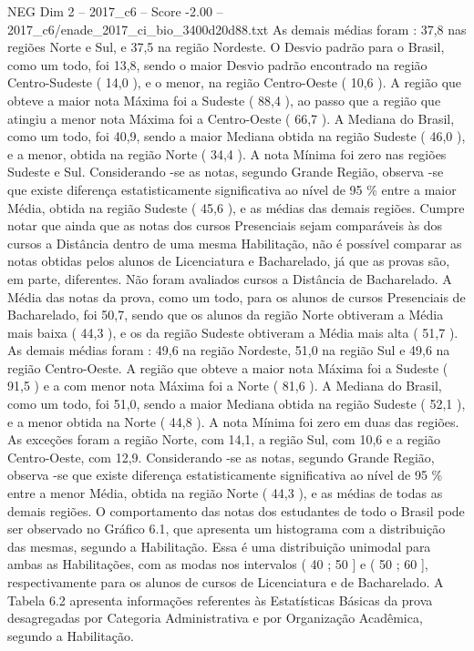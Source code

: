 \begin{textsample}{NEG Dim 2 – 2017\_c6 – Score -2.00 – 2017\_c6/enade\_2017\_ci\_bio\_3400d20d88.txt}
As demais médias foram : 37,8 nas regiões Norte e Sul, e 37,5 na região Nordeste.
O Desvio padrão para o Brasil, como um todo, foi 13,8, sendo o maior Desvio padrão encontrado na região Centro-Sudeste ( 14,0 ), e o menor, na região Centro-Oeste ( 10,6 ).
A região que obteve a maior nota Máxima foi a Sudeste ( 88,4 ), ao passo que a região que atingiu a menor nota Máxima foi a Centro-Oeste ( 66,7 ).
A Mediana do Brasil, como um todo, foi 40,9, sendo a maior Mediana obtida na região Sudeste ( 46,0 ), e a menor, obtida na região Norte ( 34,4 ).
A nota Mínima foi zero nas regiões Sudeste e Sul.
Considerando -se as notas, segundo Grande Região, observa -se que existe diferença estatisticamente significativa ao nível de 95 \% entre a maior Média, obtida na região Sudeste ( 45,6 ), e as médias das demais regiões.
Cumpre notar que ainda que as notas dos cursos Presenciais sejam comparáveis às dos cursos a Distância dentro de uma mesma Habilitação, não é possível comparar as notas obtidas pelos alunos de Licenciatura e Bacharelado, já que as provas são, em parte, diferentes.
Não foram avaliados cursos a Distância de Bacharelado.
A Média das notas da prova, como um todo, para os alunos de cursos Presenciais de Bacharelado, foi 50,7, sendo que os alunos da região Norte obtiveram a Média mais baixa ( 44,3 ), e os da região Sudeste obtiveram a Média mais alta ( 51,7 ).
As demais médias foram : 49,6 na região Nordeste, 51,0 na região Sul e 49,6 na região Centro-Oeste.
A região que obteve a maior nota Máxima foi a Sudeste ( 91,5 ) e a com menor nota Máxima foi a Norte ( 81,6 ).
A Mediana do Brasil, como um todo, foi 51,0, sendo a maior Mediana obtida na região Sudeste ( 52,1 ), e a menor obtida na Norte ( 44,8 ).
A nota Mínima foi zero em duas das regiões.
As exceções foram a região Norte, com 14,1, a região Sul, com 10,6 e a região Centro-Oeste, com 12,9.
Considerando -se as notas, segundo Grande Região, observa -se que existe diferença estatisticamente significativa ao nível de 95 \% entre a menor Média, obtida na região Norte ( 44,3 ), e as médias de todas as demais regiões.
O comportamento das notas dos estudantes de todo o Brasil pode ser observado no Gráfico 6.1, que apresenta um histograma com a distribuição das mesmas, segundo a Habilitação.
Essa é uma distribuição unimodal para ambas as Habilitações, com as modas nos intervalos ( 40 ; 50 ] e ( 50 ; 60 ], respectivamente para os alunos de cursos de Licenciatura e de Bacharelado.
A Tabela 6.2 apresenta informações referentes às Estatísticas Básicas da prova desagregadas por Categoria Administrativa e por Organização Acadêmica, segundo a Habilitação.

\end{textsample}

